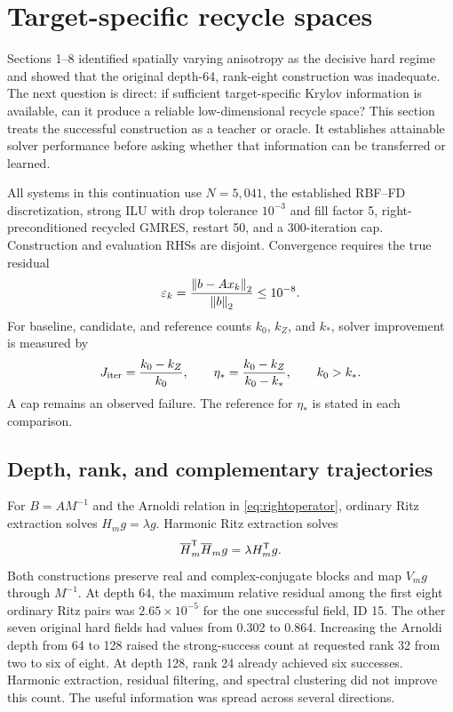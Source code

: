 \section{Target-specific recycle spaces}
\label{sec:oracle-recovery}

Sections 1--8 identified spatially varying anisotropy as the decisive hard regime and showed that the original depth-64, rank-eight construction was inadequate. The next question is direct: if sufficient target-specific Krylov information is available, can it produce a reliable low-dimensional recycle space? This section treats the successful construction as a teacher or oracle. It establishes attainable solver performance before asking whether that information can be transferred or learned.

All systems in this continuation use $N=5{,}041$, the established RBF--FD discretization, strong ILU with drop tolerance $10^{-3}$ and fill factor 5, right-preconditioned recycled GMRES, restart 50, and a 300-iteration cap. Construction and evaluation RHSs are disjoint. Convergence requires the true residual
\begin{equation}
 \varepsilon_k=\frac{\left\lVert b-Ax_k\right\rVert_2}{\left\lVert b\right\rVert_2}\le10^{-8}.
 \label{eq:continuation-residual}
\end{equation}
For baseline, candidate, and reference counts $k_0$, $k_Z$, and $k_*$, solver improvement is measured by
\begin{equation}
 J_{\rm iter}=\frac{k_0-k_Z}{k_0},\qquad
 \eta_* =\frac{k_0-k_Z}{k_0-k_*},\qquad k_0>k_*.
 \label{eq:continuation-recovery}
\end{equation}
A cap remains an observed failure. The reference for $\eta_*$ is stated in each comparison.

\subsection{Depth, rank, and complementary trajectories}

For $B=AM^{-1}$ and the Arnoldi relation in \cref{eq:rightoperator}, ordinary Ritz extraction solves $H_mg=\lambda g$. Harmonic Ritz extraction solves
\begin{equation}
 \overline H_m^{\mathsf T}\overline H_mg=\lambda H_m^{\mathsf T} g.
 \label{eq:harmonic-continuation}
\end{equation}
Both constructions preserve real and complex-conjugate blocks and map $V_mg$ through $M^{-1}$. At depth 64, the maximum relative residual among the first eight ordinary Ritz pairs was $2.65\times10^{-5}$ for the one successful field, ID 15. The other seven original hard fields had values from 0.302 to 0.864. Increasing the Arnoldi depth from 64 to 128 raised the strong-success count at requested rank 32 from two to six of eight. At depth 128, rank 24 already achieved six successes. Harmonic extraction, residual filtering, and spectral clustering did not improve this count. The useful information was spread across several directions.

